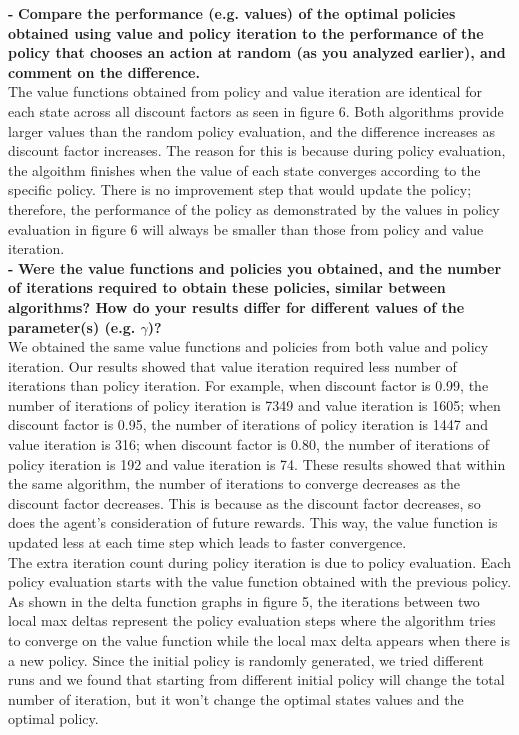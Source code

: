 \documentclass[11pt]{article}
\begin{document}
\noindent
\textbf{-}
\noindent
\textbf{Compare the performance (e.g. values) of the optimal policies obtained
using value and policy iteration to the performance of the policy that chooses
an action at random (as you analyzed earlier), and comment on the difference.}
\\

\noindent
The value functions obtained from policy and value iteration are identical for
each state across all discount factors as seen in figure 6. Both algorithms
provide larger values than the random policy evaluation, and the difference
increases as discount factor increases. The reason for this is because during
policy evaluation, the algoithm finishes when the value of each state converges
according to the specific policy. There is no improvement step that would update
the policy; therefore, the performance of the policy as demonstrated by the
values in policy evaluation in figure 6 will always be smaller than those from
policy and value iteration.\\

\noindent
\textbf{-}
\noindent
\textbf{Were the value functions and policies you obtained, and the number of
iterations required to obtain these policies, similar between algorithms? How do
your results differ for different values of the parameter(s) (e.g. $\gamma$)?}
\\

\noindent
We obtained the same value functions and policies from both value and policy
iteration. Our results showed that value iteration required less number of
iterations than policy iteration. For example, when discount factor is 0.99, the
number of iterations of policy iteration is 7349 and value iteration is 1605;
when discount factor is 0.95, the number of iterations of policy iteration is
1447 and value iteration is 316; when discount factor is 0.80, the number of
iterations of policy iteration is 192 and value iteration is 74. These results
showed that within the same algorithm, the number of iterations to converge
decreases as the discount factor decreases. This is because as the discount
factor decreases, so does the agent's consideration of future rewards. This way,
the value function is updated less at each time step which leads to faster
convergence. \\

\noindent
The extra iteration count during policy iteration is due to policy evaluation.
Each policy evaluation starts with the value function obtained with the previous
policy. As shown in the delta function graphs in figure 5, the iterations
between two local max deltas represent the policy evaluation steps where the
algorithm tries to converge on the value function while the local max delta
appears when there is a new policy. Since the initial policy is randomly
generated, we tried different runs and we found that starting from different
initial policy will change the total number of iteration, but it won’t change
the optimal states values and the optimal policy. \\
\end{document}

